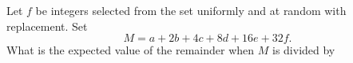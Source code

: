 Let      $f$ be integers selected from the set  uniformly and at random with replacement. Set \[ M = a + 2b + 4c + 8d + 16e + 32f. \]What is the expected value of the remainder when $M$ is divided by 